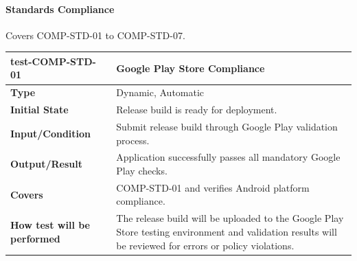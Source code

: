\documentclass[12pt, titlepage]{article}
\begin{document}
\paragraph{Standards Compliance}

Covers COMP-STD-01 to COMP-STD-07.

\noindent\begin{tabularx}{\textwidth}{>{\raggedright\arraybackslash}p{3.5cm}X}
  \toprule
  \textbf{test-COMP-STD-01} & \textbf{Google Play Store Compliance}\\
  \midrule
  \textbf{Type} & Dynamic, Automatic\\
  \textbf{Initial State} & Release build is ready for deployment.\\
  \textbf{Input/Condition} & Submit release build through Google Play validation process.\\
  \textbf{Output/Result} & Application successfully passes all mandatory Google Play checks.\\
  \textbf{Covers} & COMP-STD-01 and verifies Android platform compliance.\\
  \textbf{How test will be performed} & The release build will be uploaded to the Google Play Store testing environment and validation results will be reviewed for errors or policy violations.\\
  \bottomrule
\end{tabularx}

\vspace{1em}
\end{document}
